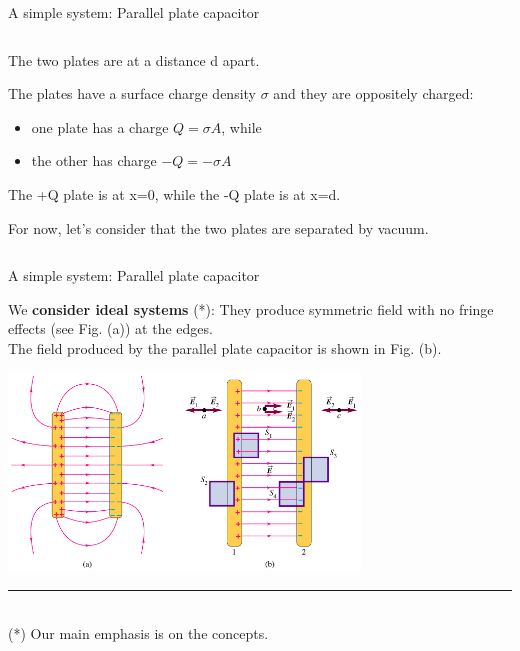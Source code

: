 \begin{frame}{A simple system: Parallel plate capacitor}
\begin{columns}
\begin{column}{0.60\textwidth}
{\begin{itemize}
{       \item The two plates are at a distance d apart.
       \item The plates have a surface charge density $\sigma$ and they are oppositely charged:
         \begin{itemize}
            \item one plate has a charge $Q = \sigma A$, while
            \item the other has charge $-Q = -\sigma A$
         \end{itemize}
       \item The +Q plate is at x=0, while the -Q plate is at x=d.
       \item For now, let's consider that the two plates are separated by vacuum.
     }
     \end{itemize}
  }
  \end{column}
\end{columns}

\end{frame}

%
%
%

\begin{frame}{A simple system: Parallel plate capacitor}

We {\bf consider ideal systems} (*):
They produce symmetric field with no fringe effects (see Fig. (a)) at the edges.\\
\vspace{0.1cm}
The field produced by the parallel plate capacitor is shown in Fig. (b).\\

\begin{center}
   \includegraphics[width=0.70\textwidth]{./images/schematics/parallel_plate_capacitor_field.png}\\
\end{center}

\noindent\rule{2cm}{0.4pt}\\
{\scriptsize
 (*) Our main emphasis is on the concepts.
}

\end{frame}

